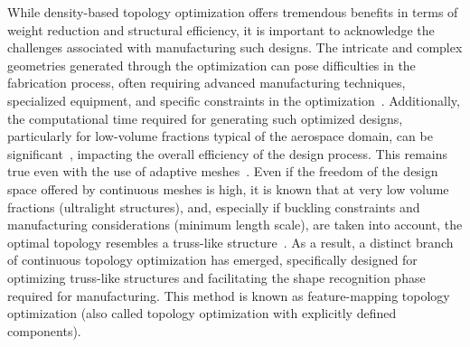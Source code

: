 While density-based topology optimization offers tremendous benefits in terms of weight reduction and structural efficiency, it is important to acknowledge the challenges associated with manufacturing such designs. The intricate and complex geometries generated through the optimization can pose difficulties in the fabrication process, often requiring advanced manufacturing techniques, specialized equipment, and specific constraints in the optimization~. Additionally, the computational time required for generating such optimized designs, particularly for low-volume fractions typical of the aerospace domain, can be significant~, impacting the overall efficiency of the design process. This remains true even with the use of adaptive meshes~. Even if the freedom of the design space offered by continuous meshes is high, it is known that at very low volume fractions (\eg ultralight structures), and, especially if buckling constraints and manufacturing considerations (\eg minimum length scale), are taken into account, the optimal topology resembles a truss-like structure~. As a result, a distinct branch of continuous topology optimization has emerged, specifically designed for optimizing truss-like structures and facilitating the shape recognition phase required for manufacturing. This method is known as feature-mapping topology optimization (also called topology optimization with explicitly defined components).

